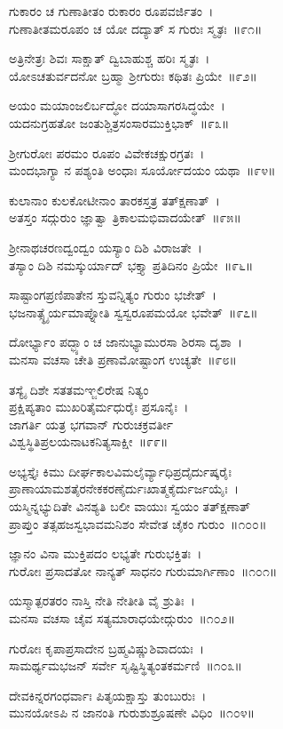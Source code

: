 ಗುಕಾರಂ ಚ ಗುಣಾತೀತಂ ರುಕಾರಂ ರೂಪವರ್ಜಿತಂ~।\\
ಗುಣಾತೀತಮರೂಪಂ ಚ ಯೋ ದದ್ಯಾತ್ ಸ ಗುರುಃ ಸ್ಮೃತಃ~॥೯೧॥

ಅತ್ರಿನೇತ್ರಃ ಶಿವಃ ಸಾಕ್ಷಾತ್ ದ್ವಿಬಾಹುಶ್ಚ ಹರಿಃ ಸ್ಮೃತಃ~।\\
ಯೋಽಚತುರ್ವದನೋ ಬ್ರಹ್ಮಾ ಶ್ರೀಗುರುಃ ಕಥಿತಃ ಪ್ರಿಯೇ~॥೯೨॥

ಅಯಂ ಮಯಾಂಜಲಿರ್ಬದ್ಧೋ ದಯಾಸಾಗರಸಿದ್ಧಯೇ~।\\
ಯದನುಗ್ರಹತೋ ಜಂತುಶ್ಚಿತ್ರಸಂಸಾರಮುಕ್ತಿಭಾಕ್~॥೯೩॥

ಶ್ರೀಗುರೋಃ ಪರಮಂ ರೂಪಂ ವಿವೇಕಚಕ್ಷುರಗ್ರತಃ~।\\
ಮಂದಭಾಗ್ಯಾ ನ ಪಶ್ಯಂತಿ ಅಂಧಾಃ ಸೂರ್ಯೋದಯಂ ಯಥಾ~॥೯೪॥

ಕುಲಾನಾಂ ಕುಲಕೋಟೀನಾಂ ತಾರಕಸ್ತತ್ರ ತತ್‌ಕ್ಷಣಾತ್~।\\
ಅತಸ್ತಂ ಸದ್ಗುರುಂ ಜ್ಞಾತ್ವಾ ತ್ರಿಕಾಲಮಭಿವಾದಯೇತ್~॥೯೫॥

ಶ್ರೀನಾಥಚರಣದ್ವಂದ್ವಂ ಯಸ್ಯಾಂ ದಿಶಿ ವಿರಾಜತೇ~।\\
ತಸ್ಯಾಂ ದಿಶಿ ನಮಸ್ಕುರ್ಯಾದ್ ಭಕ್ತ್ಯಾ ಪ್ರತಿದಿನಂ ಪ್ರಿಯೇ~॥೯೬॥

ಸಾಷ್ಟಾಂಗಪ್ರಣಿಪಾತೇನ ಸ್ತುವನ್ನಿತ್ಯಂ ಗುರುಂ ಭಜೇತ್~।\\
ಭಜನಾತ್ಸ್ಥೈರ್ಯಮಾಪ್ನೋತಿ ಸ್ವಸ್ವರೂಪಮಯೋ ಭವೇತ್~॥೯೭॥

ದೋರ್ಭ್ಯಾಂ ಪದ್ಭ್ಯಾಂ ಚ ಜಾನುಭ್ಯಾಮುರಸಾ ಶಿರಸಾ ದೃಶಾ~।\\
ಮನಸಾ ವಚಸಾ ಚೇತಿ ಪ್ರಣಾಮೋಷ್ಟಾಂಗ ಉಚ್ಯತೇ~॥೯೮॥

ತಸ್ಯೈ ದಿಶೇ ಸತತಮಞ್ಜಲಿರೇಷ ನಿತ್ಯಂ\\
ಪ್ರಕ್ಷಿಪ್ಯತಾಂ ಮುಖರಿತೈರ್ಮಧುರೈಃ ಪ್ರಸೂನೈಃ~।\\
ಜಾಗರ್ತಿ ಯತ್ರ ಭಗವಾನ್ ಗುರುಚಕ್ರವರ್ತೀ\\
ವಿಶ್ವಸ್ಥಿತಿಪ್ರಲಯನಾಟಕನಿತ್ಯಸಾಕ್ಷೀ~॥೯೯॥

ಅಭ್ಯಸ್ತೈಃ ಕಿಮು ದೀರ್ಘಕಾಲವಿಮಲೈರ್ವ್ಯಾಧಿಪ್ರದೈರ್ದುಷ್ಕರೈಃ\\
ಪ್ರಾಣಾಯಾಮಶತೈರನೇಕಕರಣೈರ್ದುಃಖಾತ್ಮಕೈರ್ದುರ್ಜಯೈಃ~।\\
ಯಸ್ಮಿನ್ನಭ್ಯುದಿತೇ ವಿನಶ್ಯತಿ ಬಲೀ ವಾಯುಃ ಸ್ವಯಂ ತತ್‌ಕ್ಷಣಾತ್\\
ಪ್ರಾಪ್ತುಂ ತತ್ಸಹಜಸ್ವಭಾವಮನಿಶಂ ಸೇವೇತ ಚೈಕಂ ಗುರುಂ~॥೧೦೦॥

ಜ್ಞಾನಂ ವಿನಾ ಮುಕ್ತಿಪದಂ ಲಭ್ಯತೇ ಗುರುಭಕ್ತಿತಃ~।\\
ಗುರೋಃ ಪ್ರಸಾದತೋ ನಾನ್ಯತ್ ಸಾಧನಂ ಗುರುಮಾರ್ಗಿಣಾಂ~॥೧೦೧॥

ಯಸ್ಮಾತ್ಪರತರಂ ನಾಸ್ತಿ ನೇತಿ ನೇತೀತಿ ವೈ ಶ್ರುತಿಃ~।\\
ಮನಸಾ ವಚಸಾ ಚೈವ ಸತ್ಯಮಾರಾಧಯೇದ್ಗುರುಂ~॥೧೦೨॥

ಗುರೋಃ ಕೃಪಾಪ್ರಸಾದೇನ ಬ್ರಹ್ಮವಿಷ್ಣುಶಿವಾದಯಃ~।\\
ಸಾಮರ್ಥ್ಯಮಭಜನ್ ಸರ್ವೇ ಸೃಷ್ಟಿಸ್ಥಿತ್ಯಂತಕರ್ಮಣಿ~॥೧೦೩॥

ದೇವಕಿನ್ನರಗಂಧರ್ವಾಃ ಪಿತೃಯಕ್ಷಾಸ್ತು ತುಂಬುರುಃ~।\\
ಮುನಯೋಽಪಿ ನ ಜಾನಂತಿ ಗುರುಶುಶ್ರೂಷಣೇ ವಿಧಿಂ~॥೧೦೪॥

